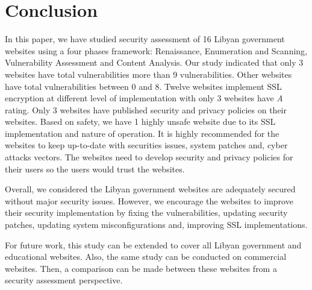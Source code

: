 \documentclass[conference]{IEEEtran}
\begin{document}
  

%





\section{Conclusion}

In this paper, we have studied security assessment of 16 Libyan government websites using a four phases framework: Renaissance, Enumeration and Scanning, Vulnerability Assessment and Content Analysis. Our study indicated that only 3 websites have total vulnerabilities more than 9 vulnerabilities. Other websites have total
vulnerabilities between 0 and 8. Twelve websites implement SSL encryption at different level of implementation with only 3 websites have \emph{A} rating. Only 3 websites have published security and privacy policies on their websites. Based on safety, we have 1 highly unsafe website due to its SSL implementation and nature of operation. It is highly recommended for the websites to keep up-to-date with securities issues, system patches and, cyber attacks vectors. The websites need to develop security and privacy policies for their users so the users would trust the websites.

Overall, we considered the Libyan government websites are adequately secured without major security issues. However, we encourage the websites to improve their security implementation by fixing the vulnerabilities, updating security patches, updating system misconfigurations and, improving SSL implementations.

For future work, this study can be extended to cover all Libyan government and educational websites. Also, the same study can be conducted on commercial websites. Then, a comparison can be made between these websites from a security assessment perspective.




\end{document}
